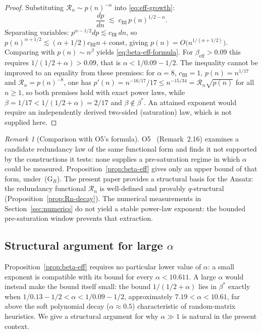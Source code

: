 \documentclass[11pt]{article}
\theoremstyle{definition}
\theoremstyle{remark}
\newtheorem{remark}[theorem]{Remark}
\newcommand{\beff}{\beta_{\mathrm{eff}}}
\newcommand{\Rn}{\mathcal{R}_n}
\begin{document}
    \begin{proof}
      Substituting $\Rn \sim p(n)^{-\alpha}$ into \eqref{eq:eff-growth}:
      \[
        \frac{dp}{dn} \;\lesssim\; c_{\mathrm{BI}} \, p(n)^{1/2 - \alpha}.
      \]
      Separating variables: $p^{\alpha - 1/2} dp \lesssim c_{\mathrm{BI}} \, dn$, so
      $p(n)^{\alpha + 1/2} \lesssim (\alpha + 1/2) c_{\mathrm{BI}} n + \text{const}$,
      giving $p(n) = O\bigl(n^{1/(\alpha + 1/2)}\bigr)$.
      Comparing with $p(n) \sim n^\beta$ yields \eqref{eq:beta-eff-formula}.
      For $\beff > 0.09$ this requires $1/(1/2+\alpha) > 0.09$, that is $\alpha < 1/0.09 - 1/2$.
      The inequality cannot be improved to an equality from these premises: for $\alpha = 8$,
      $c_{\mathrm{BI}} = 1$, $p(n) = n^{1/17}$ and $\Rn = p(n)^{-8}$, one has
      $p'(n) = n^{-16/17}/17 \leq n^{-15/34} = \Rn \sqrt{p(n)}$ for all $n \geq 1$, so both premises
      hold with exact power laws, while $\beta = 1/17 < 1/(1/2+\alpha) = 2/17$ and $\beta \notin \beta^*$.
      An attained exponent would require an independently derived two-sided (saturation) law, which
      is not supplied here.
    \end{proof}

    \begin{remark}[Comparison with O5's formula]
      \label{rem:O5-compare}
      O5~\cite{Beau2026a9} (Remark~2.16) examines a candidate redundancy law of the same functional
      form and finds it not supported by the constructions it tests: none supplies a pre-saturation
      regime in which $\alpha$ could be measured.
      Proposition~\ref{prop:beta-eff} gives only an upper bound of that form, under~(G$_R$).
      The present paper provides a structural basis for the Ansatz:
      the redundancy functional $\Rn$ is well-defined and provably $q$-structural
      (Proposition~\ref{prop:Rn-decay}).
      The numerical measurements in Section~\ref{sec:numerics} do not yield a stable
      power-law exponent: the bounded pre-saturation window prevents that extraction.
    \end{remark}

  \subsection{Structural argument for large $\alpha$}
    \label{ssec:large-alpha}

    Proposition~\ref{prop:beta-eff} requires no particular lower value of $\alpha$: a small exponent
    is compatible with its bound for every $\alpha < 10.611$.
    A large $\alpha$ would instead make the bound itself small: the bound $1/(1/2+\alpha)$ lies in
    $\beta^*$ exactly when $1/0.13 - 1/2 < \alpha < 1/0.09 - 1/2$, approximately $7.19 < \alpha < 10.61$,
    far above the soft polynomial decay ($\alpha \approx 0.5$) characteristic of random-matrix
    heuristics.
    We give a structural argument for why $\alpha \gg 1$ is natural in the present context.
\end{document}
